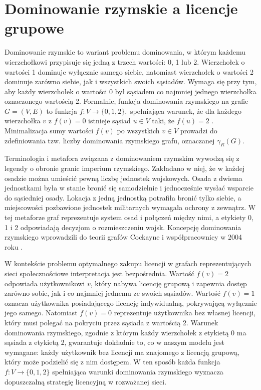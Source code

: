 \section{Dominowanie rzymskie a licencje grupowe}

Dominowanie rzymskie to wariant problemu dominowania, w którym każdemu wierzchołkowi przypisuje się jedną z trzech wartości: 0, 1 lub 2. Wierzchołek o wartości 1 dominuje wyłącznie samego siebie, natomiast wierzchołek o wartości 2 dominuje zarówno siebie, jak i wszystkich swoich sąsiadów. Wymaga się przy tym, aby każdy wierzchołek o wartości 0 był sąsiadem co najmniej jednego wierzchołka oznaczonego wartością 2. Formalnie, funkcja dominowania rzymskiego na grafie $G=(V,E)$ to funkcja $f: V \to \{0,1,2\},$ spełniająca warunek, że dla każdego wierzchołka $v$ z $f(v) = 0$ istnieje sąsiad $u \in V$ taki, że $f(u) = 2$ \cite{Favaron2009}. Minimalizacja sumy wartości $f(v)$ po wszystkich $v \in V$ prowadzi do zdefiniowania tzw. liczby dominowania rzymskiego grafu, oznaczanej $\gamma_R(G)$.

Terminologia i metafora związana z dominowaniem rzymskim wywodzą się z legendy o obronie granic imperium rzymskiego. Zakładano w niej, że w każdej osadzie można umieścić pewną liczbę jednostek wojskowych. Osada z dwiema jednostkami była w stanie bronić się samodzielnie i jednocześnie wysłać wsparcie do sąsiedniej osady. Lokacja z jedną jednostką potrafiła bronić tylko siebie, a miejscowości pozbawione jednostek militarnych wymagała ochrony z zewnątrz. W tej metaforze graf reprezentuje system osad i połączeń między nimi, a etykiety 0, 1 i 2 odpowiadają decyzjom o rozmieszczeniu wojsk. Koncepcję dominowania rzymskiego wprowadzili do teorii grafów Cockayne i współpracownicy w 2004 roku \cite{Cockayne2004}.


W kontekście problemu optymalnego zakupu licencji w grafach reprezentujących sieci społecznościowe interpretacja jest bezpośrednia. Wartość $f(v)=2$ odpowiada użytkownikowi $v$, który nabywa licencję grupową i zapewnia dostęp zarówno sobie, jak i co najmniej jednemu ze swoich sąsiadów. Wartość $f(v)=1$ oznacza użytkownika posiadającego licencję indywidualną, pokrywającą wyłącznie jego samego. Natomiast $f(v)=0$ reprezentuje użytkownika bez własnej licencji, który musi polegać na pokryciu przez sąsiada z wartością 2. Warunek dominowania rzymskiego, zgodnie z którym każdy wierzchołek z etykietą 0 ma sąsiada z etykietą 2, gwarantuje dokładnie to, co w naszym modelu jest wymagane: każdy użytkownik bez licencji ma znajomego z licencją grupową, który może podzielić się z nim dostępem. W ten sposób każda funkcja $f:V \to \{0,1,2\}$ spełniająca warunki dominowania rzymskiego wyznacza dopuszczalną strategię licencyjną w rozważanej sieci.


